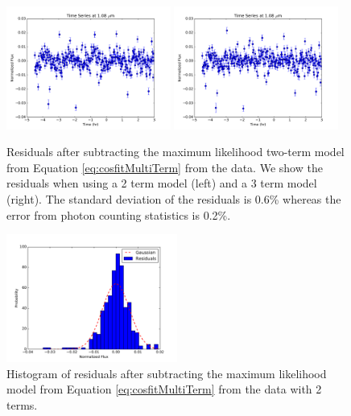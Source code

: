 \documentclass[twocolumn]{aastex6}
\begin{document}
\begin{figure}
\begin{centering}
\includegraphics[width=0.48\textwidth]{residual_2term_1080nm.pdf}
\includegraphics[width=0.48\textwidth]{residual_3term_1080nm.pdf}
\caption{Residuals after subtracting the maximum likelihood two-term model from Equation \ref{eq:cosfitMultiTerm} from the data.  We show the residuals when using a 2 term model (left) and a 3 term model (right). The standard deviation of the residuals is 0.6\% whereas the error from photon counting statistics is 0.2\%.}\label{fig:resid2Cosfit}
\end{centering}
\end{figure}

\begin{figure}
\begin{centering}
\includegraphics[width=0.5\textwidth]{histo_resids.pdf}
\caption{Histogram of residuals after subtracting the maximum likelihood model from Equation \ref{eq:cosfitMultiTerm} from the data with 2 terms.}\label{fig:histoResid2Cosfit}
\end{centering}
\end{figure}
\end{document}
